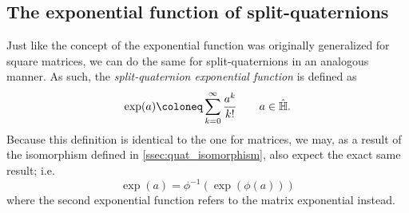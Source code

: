 \subsection{The exponential function of split-quaternions}
\label{ssec:exponential}
Just like the concept of the exponential function was originally generalized for square matrices, we can do the same for split-quaternions in an analogous manner. As such, the \emph{split-quaternion exponential function} is defined as
\begin{equation}
     \exp(a) \coloneq \sum_{k=0}^\infty \frac{a^k}{k!} \qquad a \in \spquaternions.
\end{equation}
Because this definition is identical to the one for matrices, we may, as a result of the isomorphism defined in \cref{ssec:quat_isomorphism}, also expect the exact same result; i.e.
\begin{equation}
     \exp(a) = \phi^{-1}(\exp(\phi(a)))
\end{equation}
where the second exponential function refers to the matrix exponential instead.

